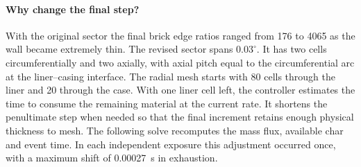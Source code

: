 \paragraph{Why change the final step?} With the original sector the final
brick edge ratios ranged from 176 to 4065 as the wall became extremely thin.
The revised sector spans $0.03^\circ$. It has two cells circumferentially and
two axially, with axial pitch equal to the circumferential arc at the
liner--casing interface. The radial mesh starts with 80 cells through the
liner and 20 through the case. With one liner cell left, the controller
estimates the time to consume the remaining material at the current rate. It
shortens the penultimate step when needed so that the final increment retains
enough physical thickness to mesh. The following solve recomputes the mass
flux, available char and event time. In each independent exposure this
adjustment occurred once, with a maximum shift of 0.00027~s in exhaustion.
\medskip

\clearpage
